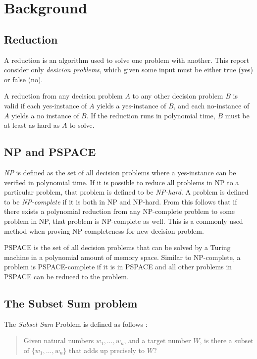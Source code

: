 \section{Background}
\label{sec:background}

\subsection{Reduction}
A reduction is an algorithm used to solve one problem with another. This report consider only \textit{desicion problems}, which given some input must be either true (yes) or false (no).

A reduction from any decision problem $A$ to any other decision problem $B$ is valid if each yes-instance of $A$ yields a yes-instance of $B$, and each no-instance of $A$ yields a no instance of $B$. If the reduction runs in polynomial time, $B$ must be at least as hard as $A$ to solve.\cite{reduction}

\subsection{NP and PSPACE}
\textit{NP} is defined as the set of all decision problems where a yes-instance can be verified in polynomial time. If it is possible to reduce all problems in NP to a particular problem, that problem is defined to be \textit{NP-hard}. A problem is defined to be \textit{NP-complete} if it is both in NP and NP-hard. From this follows that if there exists a polynomial reduction from any NP-complete problem to some problem in NP, that problem is NP-complete as well. This is a commonly used method when proving NP-completeness for new decision problem.

PSPACE is the set of all decision problems that can be solved by a Turing machine in a polynomial amount of memory space. Similar to NP-complete, a problem is PSPACE-complete if it is in PSPACE and all other problems in PSPACE can be reduced to the problem. \cite{komplexitetsklasser}

\subsection{The Subset Sum problem}

The \textit{Subset Sum} Problem is defined as follows \cite[p.~491]{algorithm}:

\begin{quote}
Given natural numbers $w_1, \ldots, w_n$, and a target number $W$, is there a subset of $\{w_1, \ldots, w_n \}$ that adds up precisely to $W$?
\end{quote}

